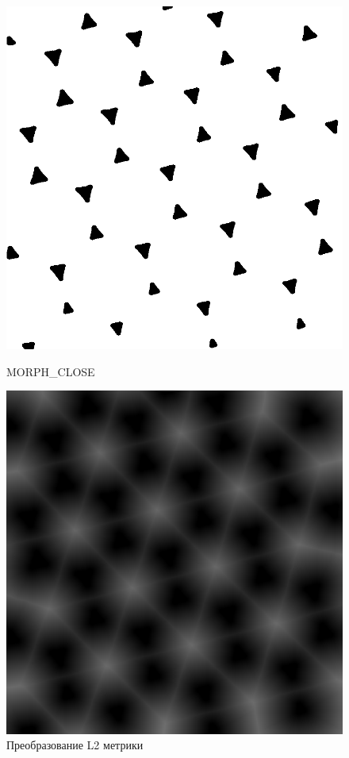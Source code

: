 \newpage
\begin{figure}[!htb]
    \includegraphics[width=\linewidth]{../img/outputs/segmentation_watershed/balls_close.png}
    \caption{MORPH\_CLOSE}
    \endminipage\hfill
    \includegraphics[width=\linewidth]{../img/outputs/segmentation_watershed/balls_dist.png}
    \caption{Преобразование L2 метрики}
    \endminipage\hfill
\end{figure}


